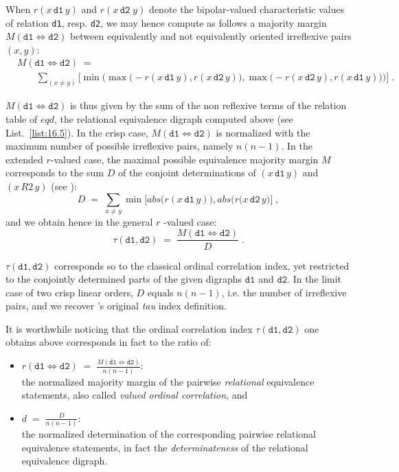 When $r(x\,\mathtt{d1}\, y)$ and $r(x\,\mathtt{d2}\; y)$ denote the bipolar-valued characteristic values of relation \texttt{d1}, resp. \texttt{d2}, we may hence compute as follows a majority margin $M(\mathtt{d1} \Leftrightarrow \mathtt{d2})$ between equivalently and not equivalently oriented irreflexive pairs $(x,y)$:
\begin{equation}\label{eq:16:2}
  \begin{split}
&M(\mathtt{d1} \Leftrightarrow \mathtt{d2}) \; =\\
&\quad \quad \sum_{(x \neq y)} \Big[ \min \Big( \max \big( -r(x \,\mathtt{d1}\, y), r(x \,\mathtt{d2}\, y)\big), \max \big( -r(x \,\mathtt{d2}\, y), r(x \,\mathtt{d1}\, y)\big) \Big) \Big]\;.
\end{split}
\end{equation}

$M(\mathtt{d1} \Leftrightarrow \mathtt{d2})$ is thus given by the sum of the non reflexive terms of the relation table of $eqd$, the relational equivalence digraph computed above (see List.~\vref{list:16.5}). In the crisp case, $M(\mathtt{d1} \Leftrightarrow \mathtt{d2})$  is normalized with the maximum number of possible irreflexive pairs, namely $n(n-1)$. In the extended $r$-valued case, the maximal possible equivalence majority margin $M$ corresponds to the sum $D$ of the conjoint determinations of $(x \,\mathtt{d1}\, y)$ and $(x \,R2\, y)$ (see \citet{BIS-2012a}):
\begin{equation}
  D \;=\; \sum_{x \neq y} \min \Big[ abs\big(r(x \,\mathtt{d1}\, y) \big), abs \big( r(x \,\mathtt{d2}\, y \big)  \Big]\;,
\end{equation}
and we obtain hence in the general $r$ -valued case:
\begin{equation}\label{eq:16.4}
  \tau(\mathtt{d1},\mathtt{d2}) \;=\; \frac{M(\mathtt{d1} \Leftrightarrow \mathtt{d2})}{D}\;.
\end{equation}

$\tau(\mathtt{d1},\mathtt{d2})$ corresponds so to the classical ordinal correlation index, yet restricted to the conjointly determined parts of the given digraphs $\mathtt{d1}$ and $\mathtt{d2}$. In the limit case of two crisp linear orders, $D$ equals $n(n-1)$, i.e. the number of irreflexive pairs, and we recover \Kendall 's original \emph{tau} index definition.

It is worthwhile noticing that the ordinal correlation index $\tau(\mathtt{d1},\mathtt{d2})$ one obtains above corresponds in fact to the ratio of:
\begin{itemize}
\item $r(\mathtt{d1} \Leftrightarrow \mathtt{d2}) \;=\; \frac{M(\mathtt{d1} \Leftrightarrow \mathtt{d2})}{n(n-1)}$:\\the normalized majority margin of the pairwise \emph{relational} equivalence statements, also called \emph{valued ordinal correlation}, and 
\item $d \;=\; \frac{D}{n(n-1)}$:\\ the normalized determination of the corresponding pairwise relational equivalence statements, in fact the \emph{determinateness} of the relational equivalence digraph.
\end{itemize}

